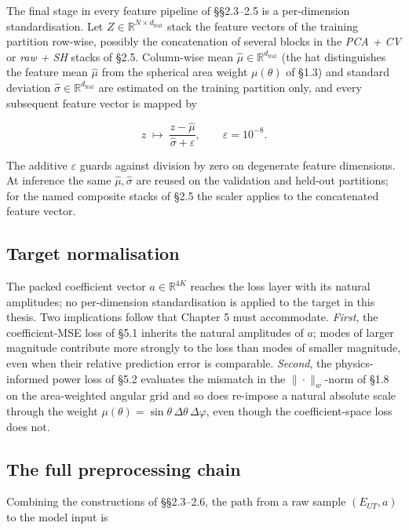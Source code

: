 \documentclass[
  english,
  11pt,
]{report}
\begin{document}
The final stage in every feature pipeline of §§2.3--2.5 is a
per-dimension standardisation. Let
\(Z \in \mathbb{R}^{N\times d_\mathrm{feat}}\) stack the feature vectors
of the training partition row-wise, possibly the concatenation of
several blocks in the \emph{PCA + CV} or \emph{raw + SH} stacks of §2.5.
Column-wise mean \(\hat\mu \in \mathbb{R}^{d_\mathrm{feat}}\) (the hat
distinguishes the feature mean \(\hat\mu\) from the spherical area
weight \(\mu(\theta)\) of §1.3) and standard deviation
\(\hat\sigma \in \mathbb{R}^{d_\mathrm{feat}}\) are estimated on the
training partition only, and every subsequent feature vector is mapped
by

\[
z\;\mapsto\;\frac{z - \hat\mu}{\hat\sigma + \varepsilon}, \qquad \varepsilon = 10^{-8}.
\]

The additive \(\varepsilon\) guards against division by zero on
degenerate feature dimensions. At inference the same
\(\hat\mu, \hat\sigma\) are reused on the validation and held-out
partitions; for the named composite stacks of §2.5 the scaler applies to
the concatenated feature vector.

\subsection{Target normalisation}\label{target-normalisation}

The packed coefficient vector \(a \in \mathbb{R}^{4K}\) reaches the loss
layer with its natural amplitudes; no per-dimension standardisation is
applied to the target in this thesis. Two implications follow that
Chapter 5 must accommodate. \emph{First}, the coefficient-MSE loss of
§5.1 inherits the natural amplitudes of \(a\); modes of larger magnitude
contribute more strongly to the loss than modes of smaller magnitude,
even when their relative prediction error is comparable. \emph{Second},
the physics-informed power loss of §5.2 evaluates the mismatch in the
\(\|\cdot\|_w\)-norm of §1.8 on the area-weighted angular grid and so
does re-impose a natural absolute scale through the weight
\(\mu(\theta) = \sin\theta\,\Delta\theta\,\Delta\varphi\), even though
the coefficient-space loss does not.

\subsection{The full preprocessing
chain}\label{the-full-preprocessing-chain}

Combining the constructions of §§2.3--2.6, the path from a raw sample
\((E_{UT}, a)\) to the model input is
\end{document}
